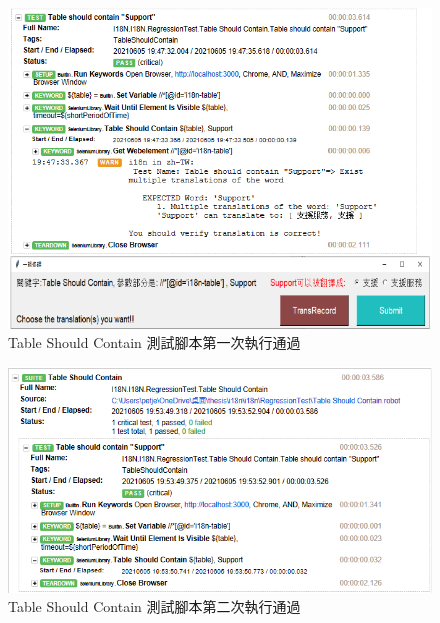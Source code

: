 \begin{figure}[H]
\includegraphics[width= \textwidth]{../論文截圖/4.1.6-2 table should contain 1st run.png}
\caption{Table Should Contain 測試腳本第一次執行通過}
\end{figure}

\begin{figure}[H]
\includegraphics[width= \textwidth]{../論文截圖/4.1.6-3 table should contain 2nd run.png}
\caption{Table Should Contain 測試腳本第二次執行通過}
\end{figure}

\hspace*{\fill} \\
\\ \hspace*{\fill} \\
\\ \hspace*{\fill} \\
\\ \hspace*{\fill} \\
\\ \hspace*{\fill} \\
